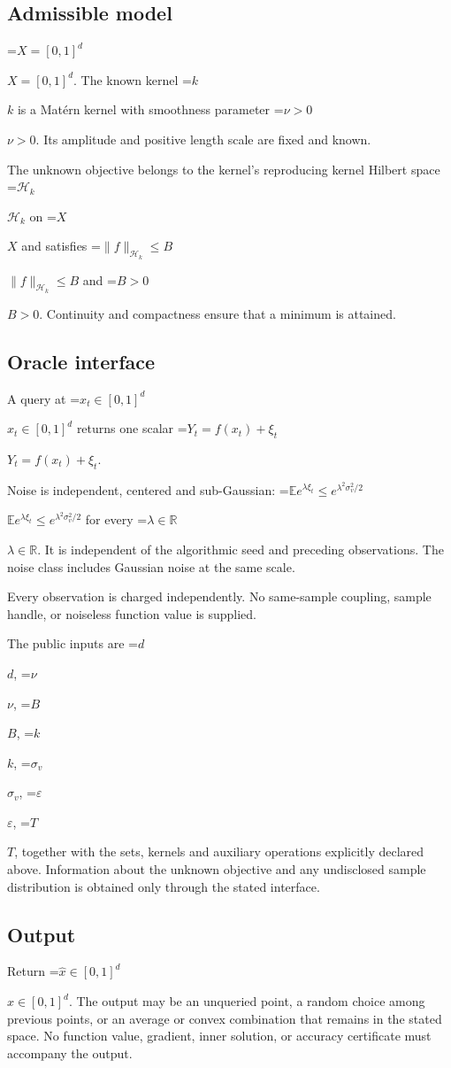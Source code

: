 \documentclass[10pt,a4paper]{article}
\newcommand{\AtlasMath}[1]{\par\begingroup\centering\setbox0=\hbox{$\displaystyle #1$}\ifdim\wd0>1.4\linewidth\typeout{ATLAS WIDE FORMULA: \the\wd0}\fi\ifdim\wd0>\linewidth\resizebox{\linewidth}{!}{\box0}\else\box0\fi\par\endgroup}
\newcommand{\AtlasInlineMath}[1]{\begingroup\setbox0=\hbox{$#1$}\ifdim\wd0>.4\linewidth\endgroup\AtlasMath{#1}\else\endgroup$#1$\fi}
\begin{document}
\subsection{Admissible model}
\AtlasInlineMath{X=[0,1]^d}. The known kernel \AtlasInlineMath{k} is a Matérn kernel with smoothness parameter \AtlasInlineMath{\nu>0}. Its amplitude and positive length scale are fixed and known.

The unknown objective belongs to the kernel's reproducing kernel Hilbert space \AtlasInlineMath{\mathcal{H}_k} on \AtlasInlineMath{X} and satisfies \AtlasInlineMath{\|f\|_{\mathcal{H}_k}\le B} and \AtlasInlineMath{B>0}. Continuity and compactness ensure that a minimum is attained.

\subsection{Oracle interface}
A query at \AtlasInlineMath{x_t\in [0,1]^d} returns one scalar \AtlasInlineMath{Y_t=f(x_t)+\xi_t}.

Noise is independent, centered and sub-Gaussian: \AtlasInlineMath{\mathbb{E} e^{\lambda\xi_t}\le e^{\lambda^2 \sigma_v^2/2}} for every \AtlasInlineMath{\lambda\in\mathbb{R}}. It is independent of the algorithmic seed and preceding observations. The noise class includes Gaussian noise at the same scale.

Every observation is charged independently. No same-sample coupling, sample handle, or noiseless function value is supplied.

The public inputs are \AtlasInlineMath{d}, \AtlasInlineMath{\nu}, \AtlasInlineMath{B}, \AtlasInlineMath{k}, \AtlasInlineMath{\sigma_v}, \AtlasInlineMath{\varepsilon}, \AtlasInlineMath{T}, together with the sets, kernels and auxiliary operations explicitly declared above. Information about the unknown objective and any undisclosed sample distribution is obtained only through the stated interface.

\subsection{Output}
Return \AtlasInlineMath{\widehat{x}\in [0,1]^d}. The output may be an unqueried point, a random choice among previous points, or an average or convex combination that remains in the stated space. No function value, gradient, inner solution, or accuracy certificate must accompany the output.
\end{document}
